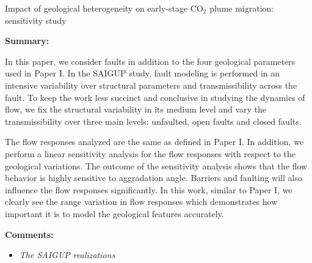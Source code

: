 %
%
{Impact of geological heterogeneity on early-stage $\mbox{CO}_2$ plume
migration: sensitivity study}
{%
\textbf{Summary:} 

In this paper, we consider faults in addition to the four geological parameters
used in Paper I. In the SAIGUP study, fault modeling is performed in an
intensive variability over structural parameters and transmissibility across the
fault. To keep the work less succinct and conclusive in studying the
dynamics of flow, we fix the structural variability in its medium level and vary
the transmissibility over three main levels: unfaulted, open faults and closed
faults.

The flow responses analyzed are the same as
  defined in Paper I. In addition, we perform a linear sensitivity analysis for
the flow responses
with respect to the geological variations. The outcome of the sensitivity analysis
shows that the flow behavior is highly sensitive to aggradation angle. Barriers
and faulting will also influence the flow responses significantly. In this
work, similar to Paper I, we clearly see the range variation in
flow responses which demonstrates how important it is to model the geological
features accurately. 

\vspace{0.5cm}
\noindent\textbf{Comments:} 

\begin{itemize}

\item \textit{The SAIGUP realizations}
 
% 


\end{itemize}}
